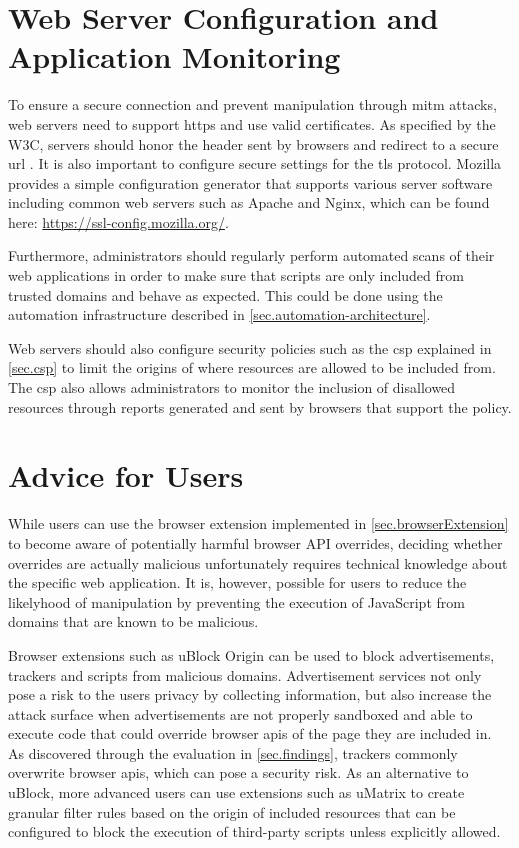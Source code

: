 \section{Web Server Configuration and Application Monitoring}
\label{sec.mitigation.webserver}

To ensure a secure connection and prevent manipulation through \ac{mitm} attacks, web servers need to support \acs{https} and use valid certificates. As specified by the W3C, servers should honor the  header sent by browsers and redirect to a secure \acs{url} \cite{UpgradeInsecureRequests}. It is also important to configure secure settings for the \ac{tls} protocol. Mozilla provides a simple configuration generator that supports various server software including common web servers such as Apache and Nginx, which can be found here: \url{https://ssl-config.mozilla.org/}.

\filbreak{}

Furthermore, administrators should regularly perform automated scans of their web applications in order to make sure that scripts are only included from trusted domains and behave as expected. This could be done using the automation infrastructure described in \autoref{sec.automation-architecture}.

Web servers should also configure security policies such as the \acs{csp} explained in \autoref{sec.csp} to limit the origins of where resources are allowed to be included from. The \acs{csp} also allows administrators to monitor the inclusion of disallowed resources through reports generated and sent by browsers that support the policy.



\section{Advice for Users}
\label{sec.mitigation.user}

While users can use the browser extension implemented in \autoref{sec.browserExtension} to become aware of potentially harmful browser API overrides, deciding whether overrides are actually malicious unfortunately requires technical knowledge about the specific web application. It is, however, possible for users to reduce the likelyhood of manipulation by preventing the execution of JavaScript from domains that are known to be malicious.

Browser extensions such as uBlock Origin can be used to block advertisements, trackers and scripts from malicious domains. Advertisement services not only pose a risk to the users privacy by collecting information, but also increase the attack surface when advertisements are not properly sandboxed and able to execute code that could override browser \acsp{api} of the page they are included in. As discovered through the evaluation in \autoref{sec.findings}, trackers commonly overwrite browser \acsp{api}, which can pose a security risk. As an alternative to uBlock, more advanced users can use extensions such as uMatrix to create granular filter rules based on the origin of included resources that can be configured to block the execution of third-party scripts unless explicitly allowed.
